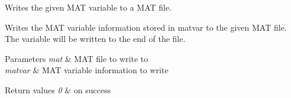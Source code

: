 Writes the given MAT variable to a MAT file. 

Writes the MAT variable information stored in matvar to the given MAT file. The variable will be written to the end of the file.


\begin{DoxyParams}{Parameters}
{\em mat} & MAT file to write to \\
\hline
{\em matvar} & MAT variable information to write \\
\hline
\end{DoxyParams}

\begin{DoxyRetVals}{Return values}
{\em 0} & on success \\
\hline
\end{DoxyRetVals}
